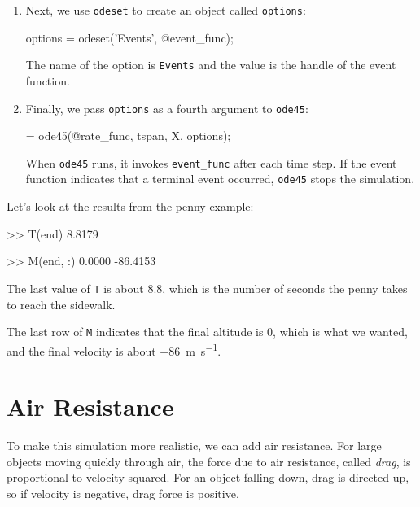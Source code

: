 \begin{enumerate}
\item Next, we use \lstinline{odeset} to create an object called \lstinline{options}:

\begin{code}
options = odeset('Events', @event_func);
\end{code}
%
The name of the option is \lstinline{Events} and the value is the handle of the event function.

\item Finally, we pass \lstinline{options} as a fourth argument to \lstinline{ode45}:

\begin{code}
[T, M] = ode45(@rate_func, tspan, X, options);
\end{code}

When \lstinline{ode45} runs, it invokes \lstinline{event_func} after each time step.  If the event function indicates that a terminal event occurred,
\lstinline{ode45} stops the simulation.

\end{enumerate}

Let's look at the results from the penny example:

\begin{code}
>> T(end)
8.8179

>> M(end, :)
0.0000  -86.4153
\end{code}

The last value of \lstinline{T} is about 8.8, which is the number of seconds the penny takes to reach the sidewalk.

The last row of \lstinline{M} indicates that the final altitude is 0, which is what we wanted, and the final velocity is about \SI{-86}{\meter \per \second}.


\section{Air Resistance}
\label{air_resistance}


To make this simulation more realistic, we can add air resistance.
For large objects moving quickly through air, the force due to air resistance, called \emph{drag}, is proportional to velocity squared.
For an object falling down, drag is
directed up, so if velocity is negative, drag force is positive.


